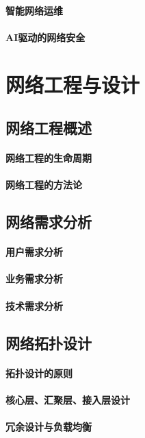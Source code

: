 \documentclass{book}
\begin{document}
\subsubsection{智能网络运维}
\subsubsection{AI驱动的网络安全}

\chapter{网络工程与设计}
\section{网络工程概述}
\subsubsection{网络工程的生命周期}
\subsubsection{网络工程的方法论}
\section{网络需求分析}
\subsubsection{用户需求分析}
\subsubsection{业务需求分析}
\subsubsection{技术需求分析}
\section{网络拓扑设计}
\subsubsection{拓扑设计的原则}
\subsubsection{核心层、汇聚层、接入层设计}
\subsubsection{冗余设计与负载均衡}
\end{document}
